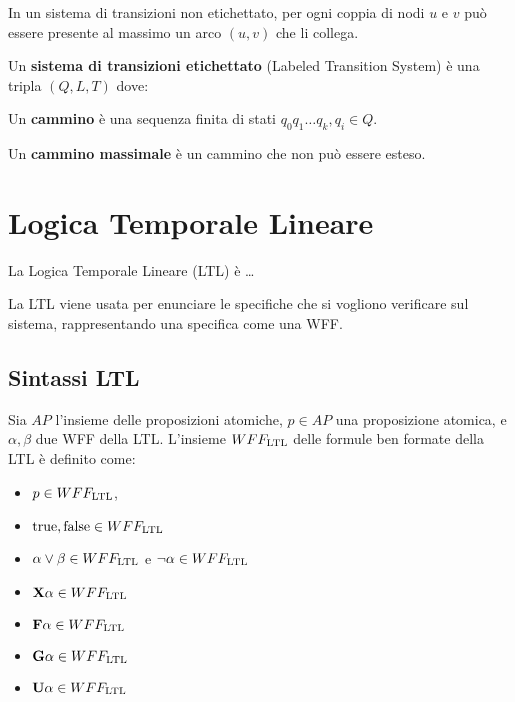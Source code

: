 \begin{rem}
    In un sistema di transizioni non etichettato, per ogni coppia di nodi $u$ e $v$ può essere presente al massimo un arco $(u, v)$ che li collega.
\end{rem}

\begin{defn}
    Un \textbf{sistema di transizioni etichettato} (Labeled Transition System) è una tripla $(Q, L, T)$ dove: 
\end{defn}

\begin{defn}
    Un \textbf{cammino} è una sequenza finita di stati $q_0 q_1 \ldots q_k, q_i \in Q$.
\end{defn}

\begin{defn}
    Un \textbf{cammino massimale} è un cammino che non può essere esteso.
    
\end{defn}

\section{Logica Temporale Lineare}
La Logica Temporale Lineare (LTL) è \ldots

La LTL viene usata per enunciare le specifiche che si vogliono verificare sul sistema, rappresentando una specifica come una WFF.

\subsection{Sintassi LTL}
Sia $AP$ l'insieme delle proposizioni atomiche, $p \in AP$ una proposizione atomica, e $\alpha, \beta$ due WFF della LTL.
L'insieme $WFF_{\textnormal{LTL}}$ delle formule ben formate della LTL è definito come:
\begin{itemize}
    \item $p \in WFF_{\textnormal{LTL}}$,
    \item $\textnormal{true}, \textnormal{false} \in WFF_{\textnormal{LTL}}$
    \item $\alpha \lor \beta \in WFF_{\textnormal{LTL}}$ e $\lnot \alpha \in WFF_{\textnormal{LTL}}$
    \item $\textnormal{\textbf{X}} \alpha \in WFF_{\textnormal{LTL}}$
    \item $\textnormal{\textbf{F}} \alpha \in WFF_{\textnormal{LTL}}$
    \item $\textnormal{\textbf{G}} \alpha \in WFF_{\textnormal{LTL}}$
    \item $\textnormal{\textbf{U}} \alpha \in WFF_{\textnormal{LTL}}$
\end{itemize}

